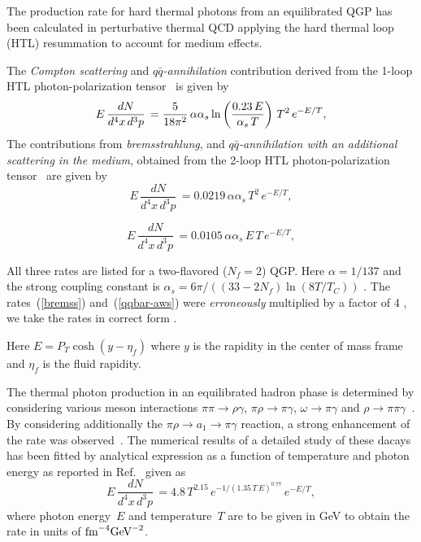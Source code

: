   The production rate for hard thermal photons from an equilibrated 
QGP has been calculated in
perturbative thermal QCD applying the hard thermal loop (HTL)
resummation to account for medium effects. 


The {\em Compton scattering} and {\em $q\bar{q}$-annihilation} contribution
derived from the 1-loop HTL photon-polarization 
tensor~\cite{KAPUSTA_1991,BAIER_1991,TRAXLER_1995} is given by
%
\begin{equation} 
 E\,\frac{dN}{d^4x\,d^3p} \, =  {5\over 18 \pi^2}\,\alpha \alpha_s 
       \ln \left(\frac{0.23\,E}{\alpha_s\,T}\right)
            \,T^2\,e^{-E/T},
\label{1-loop}
\end{equation}
%
The contributions from {\em bremsstrahlung}, 
and {\em $q\bar{q}$-annihilation with an additional scattering in the medium},
obtained from the 2-loop HTL photon-polarization
tensor~\cite{AURENCHE_1998,THOMA} are given by
%
\begin{equation} 
   E\,\frac{dN}{d^4x\,d^3p} \, = 
        0.0219\,\alpha \alpha_s
        \,T^2\,e^{-E/T},
\label{bremss}
\end{equation}
%

%
\begin{equation} 
      E\,\frac{dN}{d^4x\,d^3p} \, =  
        0.0105\,\alpha \alpha_s
        \,E\,T\,e^{-E/T},
\label{qqbar-aws}
\end{equation}
%

All three rates are listed for a two-flavored
($N_f = 2$) QGP. Here $\alpha=1/137$ and the strong coupling constant is 
$\alpha_s= 6\pi/((33-2N_f) \ln(8T/T_C))$ \cite{KARSCH}.
The rates~(\ref{bremss}) and~(\ref{qqbar-aws}) were 
{\em erroneously} multiplied 
by a factor of 4 \cite{AURENCHE_1998}, 
we take the rates in correct form \cite{THOMA}.

Here $E=P_T \cosh(y-\eta_f)$ where $y$ is the rapidity in the center
of mass frame and $\eta_f$ is the fluid rapidity.

 The thermal photon production in an equilibrated hadron phase
is determined by considering various meson interactions
$\pi \pi \rightarrow \rho \gamma$, $\pi \rho \rightarrow \pi
\gamma$, $\omega \rightarrow \pi \gamma$ and $\rho
\rightarrow \pi \pi \gamma$~\cite{KAPUSTA_1991,NADEAU_1992}.  By considering
additionally the $\pi \rho \rightarrow a_1 \rightarrow \pi \gamma$ reaction, a
strong enhancement of the rate was observed~\cite{XIONG_1992}. 
 The numerical results of a detailed study of these dacays has been
fitted by analytical expression as a function of temperature and photon
energy as reported in Ref.~\cite{THOMA} given as
%
\begin{equation} 
        E\,\frac{dN}{d^4x\,d^3p} \, = 
        4.8\,T^{2.15}\,e^{-1/(1.35\,T\,E)^{0.77}}\,e^{-E/T},
\label{Markus_suggestion}
\end{equation} 
%
where photon energy~$E$ and temperature~$T$ are to be given in GeV to obtain the
rate in units of $\mbox{fm}^{-4}\mbox{GeV}^{-2}$. 

